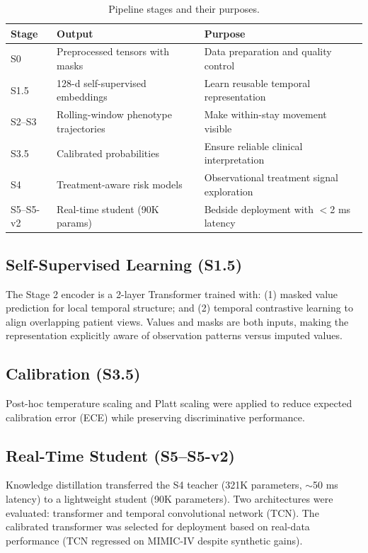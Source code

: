 \documentclass[11pt,a4paper]{article}
\begin{document}
\begin{table}[htbp]
\centering
\caption{Pipeline stages and their purposes.}
\label{tab:stages}
\small
\begin{tabularx}{\textwidth}{lXX}
\toprule
\textbf{Stage} & \textbf{Output} & \textbf{Purpose} \\
\midrule
S0 & Preprocessed tensors with masks & Data preparation and quality control \\
S1.5 & 128-d self-supervised embeddings & Learn reusable temporal representation \\
S2--S3 & Rolling-window phenotype trajectories & Make within-stay movement visible \\
S3.5 & Calibrated probabilities & Ensure reliable clinical interpretation \\
S4 & Treatment-aware risk models & Observational treatment signal exploration \\
S5--S5-v2 & Real-time student (90K params) & Bedside deployment with $<$2 ms latency \\
\bottomrule
\end{tabularx}
\end{table}

\subsection{Self-Supervised Learning (S1.5)}

The Stage 2 encoder is a 2-layer Transformer trained with: (1) masked value prediction for local temporal structure; and (2) temporal contrastive learning to align overlapping patient views. Values and masks are both inputs, making the representation explicitly aware of observation patterns versus imputed values.

\subsection{Calibration (S3.5)}

Post-hoc temperature scaling and Platt scaling were applied to reduce expected calibration error (ECE) while preserving discriminative performance.

\subsection{Real-Time Student (S5--S5-v2)}

Knowledge distillation transferred the S4 teacher (321K parameters, $\sim$50 ms latency) to a lightweight student (90K parameters). Two architectures were evaluated: transformer and temporal convolutional network (TCN). The calibrated transformer was selected for deployment based on real-data performance (TCN regressed on MIMIC-IV despite synthetic gains).
\end{document}
